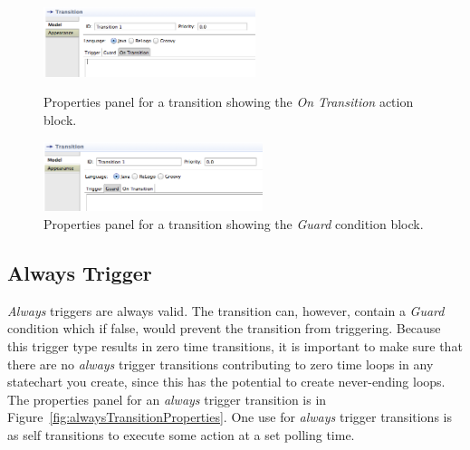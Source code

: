 \documentclass[11pt]{amsart}
\begin{document}
\begin{figure}

\begin{minipage}{.5\textwidth}
\begin{center}
\vspace{.2in}
\centerline {
\includegraphics[height=0.8in]{StatechartsImages/TransitionPropertiesOnTransition.png}
}
\caption{Properties panel for a transition showing the \emph{On Transition} action block.}
\label{fig:transitionPropertiesOnTransition}
\end{center}
\end{minipage}%
\begin{minipage}{.5\textwidth}
\begin{center}
\vspace{.2in}
\centerline {
\includegraphics[height=0.8in]{StatechartsImages/TransitionPropertiesGuard.png}
}
\caption{Properties panel for a transition showing the \emph{Guard} condition block.}
\label{fig:transitionPropertiesGuard}
\end{center}
\end{minipage}

\end{figure}
\clearpage

\subsection{Always Trigger}
\label{sec:alwaysTransition}
\emph{Always} triggers are always valid. The transition can, however, contain a \emph{Guard} condition which if false, would prevent the transition from triggering. Because this trigger type results in zero time transitions, it is important to make sure that there are no \emph{always} trigger transitions contributing to zero time loops in any statechart you create, since this has the potential to create never-ending loops. The properties panel for an \emph{always} trigger transition is in Figure~\ref{fig:alwaysTransitionProperties}. One use for \emph{always} trigger transitions is as self transitions to execute some action at a set polling time.
\end{document}

